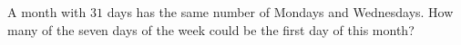 A month with $31$ days has the same number of Mondays and Wednesdays. How many of the seven days of the week could be the first day of this month?
